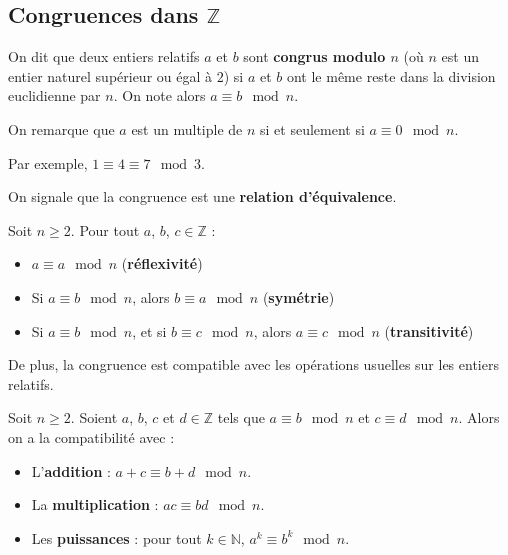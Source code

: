 	\subsection{Congruences dans $\mathbb{Z}$}

	\begin{formula}[Définition]
		On dit que deux entiers relatifs $a$ et $b$ sont \textbf{congrus modulo $n$} (où $n$ est un entier naturel supérieur ou égal à $2$) si $a$ et $b$ ont le même reste dans la division euclidienne par $n$. On note alors $a \equiv b \mod n$.
	\end{formula}

	\begin{tip}
		On remarque que $a$ est un multiple de $n$ si et seulement si $a \equiv 0 \mod n$.
	\end{tip}

	\begin{tip}[Exemple]
		Par exemple, $1 \equiv 4 \equiv 7 \mod 3$.
	\end{tip}

	On signale que la congruence est une \textbf{relation d'équivalence}.

	\begin{formula}[Propriétés]
		Soit $n \geq 2$. Pour tout $a$, $b$, $c \in \mathbb{Z}$ :
		\begin{itemize}
			\item $a \equiv a \mod n$ (\textbf{réflexivité})
			\item Si $a \equiv b \mod n$, alors $b \equiv a \mod n$ (\textbf{symétrie})
			\item Si $a \equiv b \mod n$, et si $b \equiv c \mod n$, alors $a \equiv c \mod n$ (\textbf{transitivité})
		\end{itemize}
	\end{formula}

	De plus, la congruence est compatible avec les opérations usuelles sur les entiers relatifs.

	\begin{formula}[Propriétés]
		Soit $n \geq 2$. Soient $a$, $b$, $c$ et $d \in \mathbb{Z}$ tels que $a \equiv b \mod n$ et $c \equiv d \mod n$. Alors on a la compatibilité avec :
		\begin{itemize}
			\item L'\textbf{addition} : $a + c \equiv b + d \mod n$.
			\item La \textbf{multiplication} : $ac \equiv bd \mod n$.
			\item Les \textbf{puissances} : pour tout $k \in \mathbb{N}$, $a^k \equiv b^k \mod n$.
		\end{itemize}
	\end{formula}

